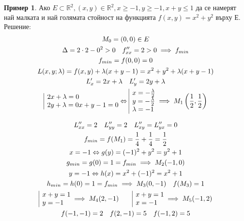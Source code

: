\documentclass[a4paper,fleqn,12pt]{article}
\theoremstyle{definition}
\newtheorem{example}{Пример}[subsection]
\begin{document}
\begin{example}
Ако $E \subset \mathbb{R}^2, (x,y) \in \mathbb{R}^2, x \geq -1, y \geq -1, x+y \leq 1$ да се намерят най малката и най голямата стойност на функцията $f(x,y) = x^2 + y^2$ върху Е.\\
Решение:
\begin{gather*}
M_0 = (0,0) \in E \\
\Delta = 2 \cdot 2 - 0^2 >0 \quad f''_{xx} = 2 > 0 \implies f_{min} \\
f_{min} = f(0,0) = 0 \\
L(x,y;\lambda) = f(x,y) + \lambda(x+y-1) = x^2 + y^2 + \lambda(x+y-1) \\
L'_x = 2x + \lambda \quad L'_y = 2y + \lambda \\
\begin{array}{|l@{}}
2x + \lambda = 0\\
2y + \lambda = 0
x+y - 1 = 0
\end{array} \Leftrightarrow 
\begin{array}{|l@{}}
x = - \frac{\lambda}{2} \\
y= - \frac{\lambda}{2} \\
\lambda  = -1
\end{array} 
\implies M_1 \left( \frac{1}{2},\frac{1}{2} \right) 
\end{gather*}

\begin{gather*}
L''_{xx} = 2 \quad L''_{yy} = 2 \quad L''_{xy} = L''_{yx} = 0 \\
f_{min} = f(M_1)  = \frac{1}{4} + \frac{1}{4} = \frac{1}{2}\\
x = -1 \Leftrightarrow g(y) = (-1)^2 + y^2 = y^2 + 1 \\
g_{min} = g(0) = 1 = f_{min} \implies M_2(-1,0)\\
y = -1 \Leftrightarrow h(x) = x^2 + (-1)^2 = x^2 + 1 \\
h_{min} = h(0) = 1 = f_{min} \implies M_3(0,-1) \quad f(M_3) = 1\\
\begin{array}{|l@{}}
x + y = 1 \\
y = -1\\
\end{array}  \implies M_4(2,-1) 
\qquad 
\begin{array}{|l@{}}
x + y = 1  \\
x = -1\\
\end{array}  \implies M_5(-1,2) \\
f(-1,-1) = 2  \quad f(2,-1) = 5 \quad f(-1,2) = 5
\end{gather*}

\end{example}
\end{document}
